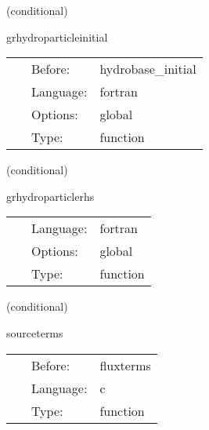 \documentclass{article}
\begin{document}
\vspace{5mm}

   (conditional) 

\hspace{5mm} grhydroparticleinitial 

\hspace{5mm}{\it initial data for the particle arrays } 


\hspace{5mm}

 \begin{tabular*}{160mm}{cll} 
~ & Before:  & hydrobase\_initial \\ 
~ & Language:  & fortran \\ 
~ & Options:  & global \\ 
~ & Type:  & function \\ 
\end{tabular*} 


\vspace{5mm}

   (conditional) 

\hspace{5mm} grhydroparticlerhs 

\hspace{5mm}{\it update terms for the particles } 


\hspace{5mm}

 \begin{tabular*}{160mm}{cll} 
~ & Language:  & fortran \\ 
~ & Options:  & global \\ 
~ & Type:  & function \\ 
\end{tabular*} 


\vspace{5mm}

   (conditional) 

\hspace{5mm} sourceterms 

\hspace{5mm}{\it source term calculation } 


\hspace{5mm}

 \begin{tabular*}{160mm}{cll} 
~ & Before:  & fluxterms \\ 
~ & Language:  & c \\ 
~ & Type:  & function \\ 
\end{tabular*} 
\end{document}
